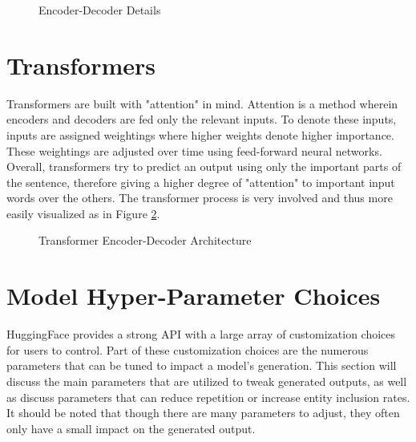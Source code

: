 \documentclass[12pt]{report}
\begin{document}
        \begin{figure}[H]
            \centering
            \caption{Encoder-Decoder Details~\cite{HF_course}}
            \label{fig:seq2seq1}
        \end{figure}
    
    
    
    \section{Transformers}
        Transformers are built with "attention" in mind. Attention is a method wherein encoders and decoders are fed only the relevant inputs. To denote these inputs, inputs are assigned weightings where higher weights denote higher importance. These weightings are adjusted over time using feed-forward neural networks. Overall, transformers try to predict an output using only the important parts of the sentence, therefore giving a higher degree of "attention" to important input words over the others. The transformer process is very involved and thus more easily visualized as in Figure \ref{fig:seq2seq2}.
    \newpage
        \begin{figure}[H]
            \centering
            \makebox[\textwidth]{}
            \caption{Transformer Encoder-Decoder Architecture ~\cite{HF_course}}
            \label{fig:seq2seq2}
        \end{figure}
    
    \newpage
    \section{Model Hyper-Parameter Choices}
    
        HuggingFace provides a strong API with a large array of customization choices~\cite{HF} for users to control. Part of these customization choices are the numerous parameters that can be tuned to impact a model's generation. This section will discuss the main parameters that are utilized to tweak generated outputs, as well as discuss parameters that can reduce repetition or increase entity inclusion rates. It should be noted that though there are many parameters to adjust, they often only have a small impact on the generated output.
        
\end{document}
